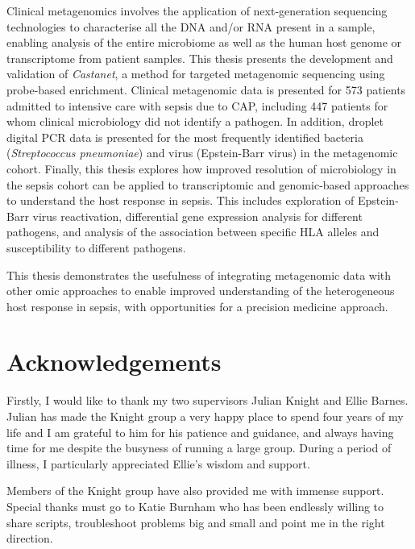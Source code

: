 Clinical metagenomics involves the application of next-generation sequencing technologies to characterise all the DNA and/or RNA present in a sample, enabling analysis of the entire microbiome as well as the human host genome or transcriptome from patient samples. This thesis presents the development and validation of \textit{Castanet}, a method for targeted metagenomic sequencing using probe-based enrichment. Clinical metagenomic data is presented for 573 patients admitted to intensive care with sepsis due to CAP, including 447 patients for whom clinical microbiology did not identify a pathogen. In addition, droplet digital PCR data is presented for the most frequently identified bacteria (\textit{Streptococcus pneumoniae}) and virus (Epstein-Barr virus) in the metagenomic cohort. Finally, this thesis explores how improved resolution of microbiology in the sepsis cohort can be applied to transcriptomic and genomic-based approaches to understand the host response in sepsis. This includes exploration of Epstein-Barr virus reactivation, differential gene expression analysis for different pathogens, and analysis of the association between specific HLA alleles and susceptibility to different pathogens.

This thesis demonstrates the usefulness of integrating metagenomic data with other omic approaches to enable improved understanding of the heterogeneous host response in sepsis, with opportunities for a precision medicine approach.


 







\newpage
\chapter*{Acknowledgements}
\thispagestyle{plain}
\noindent
\singlespacing

Firstly, I would like to thank my two supervisors Julian Knight and Ellie Barnes. Julian has made the Knight group a very happy place to spend four years of my life and I am grateful to him for his patience and guidance, and always having time for me despite the busyness of running a large group. During a period of illness, I particularly appreciated Ellie's wisdom and support.

Members of the Knight group have also provided me with immense support. Special thanks must go to Katie Burnham who has been endlessly willing to share scripts, troubleshoot problems big and small and point me in the right direction. 

